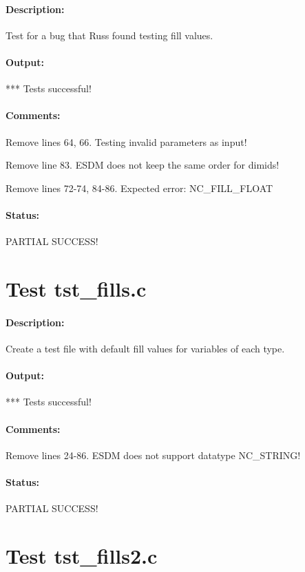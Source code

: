 \paragraph{Description:} Test for a bug that Russ found testing fill values.

\paragraph{Output:} *** Tests successful!

\paragraph{Comments:} Remove lines 64, 66. Testing invalid parameters as input!

Remove line 83. ESDM does not keep the same order for dimids!

Remove lines 72-74, 84-86. Expected error: NC\_FILL\_FLOAT

\paragraph{Status:} PARTIAL SUCCESS!

\section{Test tst\_fills.c}

\paragraph{Description:} Create a test file with default fill values for variables of each type.

\paragraph{Output:} *** Tests successful!

\paragraph{Comments:} Remove lines 24-86. ESDM does not support datatype NC\_STRING!

\paragraph{Status:} PARTIAL SUCCESS!

\section{Test tst\_fills2.c}

